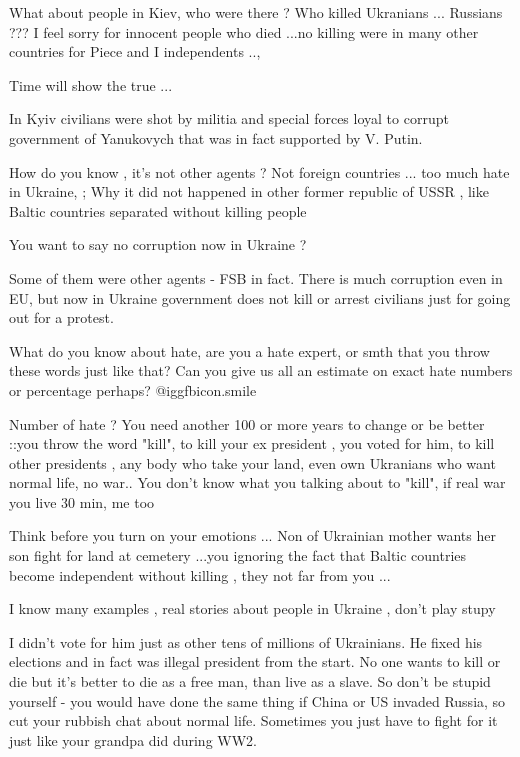 \begin{itemize}
\begin{itemize}

What about people in Kiev, who were there ? Who killed Ukranians ... Russians
??? I feel sorry for innocent people who died ...no killing were in many other
countries for Piece and I independents ..,

Time will show the true ...


In Kyiv civilians were shot by militia and special forces loyal to corrupt
government of Yanukovych that was in fact supported by V. Putin.

How do you know , it's not other agents ? Not foreign countries ...
too much hate in Ukraine, ;
Why it did not happened in other former republic of
USSR , like Baltic countries separated without killing people

You want to say no corruption now in Ukraine ?


Some of them were other agents - FSB in fact. There is much corruption even in
EU, but now in Ukraine government does not kill or arrest civilians just for
going out for a protest.

What do you know about hate, are you a hate expert, or smth that you throw
these words just like that? Can you give us all an estimate on exact hate
numbers or percentage perhaps?  @igg{fbicon.smile} 


Number of hate ? You need another 100 or more years to change or be better
::you throw the word "kill", to kill your ex president , you voted for him, to
kill other presidents , any body who take your land, even own Ukranians who
want normal life, no war.. You don't know what you talking about to "kill", if
real war you live 30 min, me too

Think before you turn on your emotions ... Non of Ukrainian mother wants her
son fight for land at cemetery ...you ignoring the fact that Baltic countries
become independent without killing , they not far from you ...

I know many examples , real stories about people in Ukraine , don't play stupy


I didn't vote for him just as other tens of millions of Ukrainians. He fixed
his elections and in fact was illegal president from the start. No one wants to
kill or die but it's better to die as a free man, than live as a slave. So
don't be stupid yourself - you would have done the same thing if China or US
invaded Russia, so cut your rubbish chat about normal life. Sometimes you just
have to fight for it just like your grandpa did during WW2.


\end{itemize}
\end{itemize}
